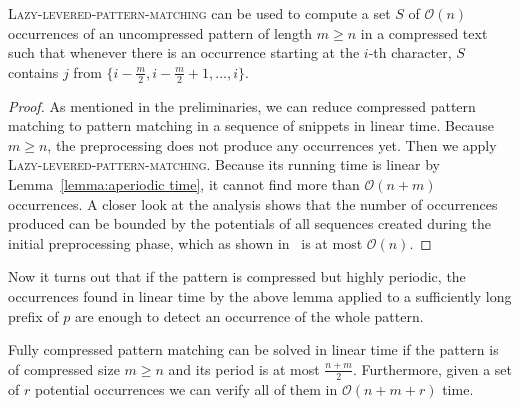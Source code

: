 \documentclass[runningheads]{llncs}
\newcommand{\proc}[1]{\textnormal{\scshape#1}}
\begin{document}
\begin{lemma}\label{lemma:set of occurrences}
\proc{Lazy-levered-pattern-matching} can be used to compute a set $S$ of $\mathcal{O}(n)$ occurrences of an uncompressed pattern of length $m\geq n$ in a compressed text such that whenever there is an occurrence starting at the $i$-th character, $S$ contains $j$ from $\{i-\frac{m}{2},i-\frac{m}{2}+1,\ldots,i\}$.
\end{lemma}

\begin{proof}
As mentioned in the preliminaries, we can reduce compressed pattern matching to pattern matching in a sequence of snippets in linear time.
Because $m\geq n$, the preprocessing does not produce any occurrences yet. Then we apply \proc{Lazy-levered-pattern-matching}. Because its
running time is linear by Lemma~\ref{lemma:aperiodic time}, it cannot find more than $\mathcal{O}(n+m)$ occurrences. A closer look
at the analysis shows that the number of occurrences produced can be bounded by the potentials of all sequences created during
the initial preprocessing phase, which as shown in~\cite{GawrychowskiLZW} is at most $\mathcal{O}(n)$.
\end{proof}

Now it turns out that if the pattern is compressed but highly periodic, the occurrences found in linear time by the above lemma applied to
a sufficiently long prefix of $p$ are enough to detect an occurrence of the whole pattern.

\begin{lemma}
\label{lemma:periodic}
Fully compressed pattern matching can be solved in linear time if the pattern is of compressed size $m\geq n$ and its period is at most $\frac{n+m}{2}$. Furthermore, given a set of $r$ potential occurrences we can verify all of them in $\mathcal{O}(n+m+r)$ time.
\end{lemma}
\end{document}
